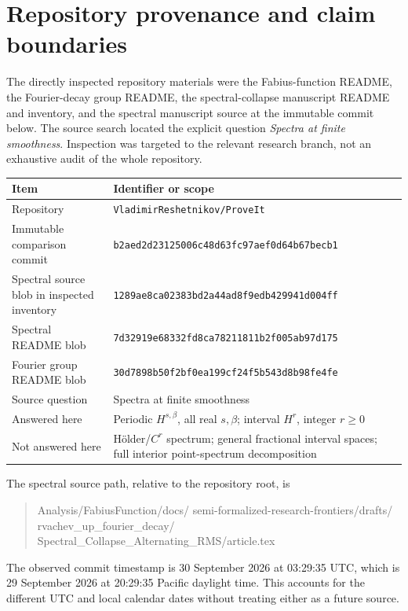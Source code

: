 \documentclass[11pt,a4paper]{article}
\theoremstyle{definition}
\theoremstyle{remark}
\numberwithin{equation}{section}
\begin{document}
\appendix
\section{Repository provenance and claim boundaries}
\label{sec:provenance}
The directly inspected repository materials were the Fabius-function
README, the Fourier-decay group README, the spectral-collapse manuscript
README and inventory, and the spectral manuscript source at the immutable
commit below. The source search located the explicit question
\emph{Spectra at finite smoothness}. Inspection was targeted to the relevant
research branch, not an exhaustive audit of the whole repository.

\begin{center}\small
\begin{tabularx}{\textwidth}{@{}lX@{}}
\toprule
Item & Identifier or scope\\
\midrule
Repository & \texttt{VladimirReshetnikov/ProveIt}\\
Immutable comparison commit &
\texttt{b2aed2d23125006c48d63fc97aef0d64b67becb1}\\
Spectral source blob in inspected inventory &
\texttt{1289ae8ca02383bd2a44ad8f9edb429941d004ff}\\
Spectral README blob &
\texttt{7d32919e68332fd8ca78211811b2f005ab97d175}\\
Fourier group README blob &
\texttt{30d7898b50f2bf0ea199cf24f5b543d8b98fe4fe}\\
Source question & Spectra at finite smoothness\\
Answered here & Periodic $H^{s,\beta}$, all real $s,\beta$; interval $H^r$, integer $r\ge0$\\
Not answered here & H\"older/$C^r$ spectrum; general fractional interval spaces; full interior point-spectrum decomposition\\
\bottomrule
\end{tabularx}
\end{center}
The spectral source path, relative to the repository root, is
\begin{quote}\small\ttfamily\raggedright
Analysis/FabiusFunction/docs/\allowbreak
semi-formalized-research-frontiers/drafts/\allowbreak
rvachev\_up\_fourier\_decay/\allowbreak
Spectral\_Collapse\_Alternating\_RMS/article.tex
\end{quote}
The observed commit timestamp is 30 September 2026 at 03:29:35 UTC,
which is 29 September 2026 at 20:29:35 Pacific daylight time. This accounts
for the different UTC and local calendar dates without treating either
as a future source.
\end{document}
